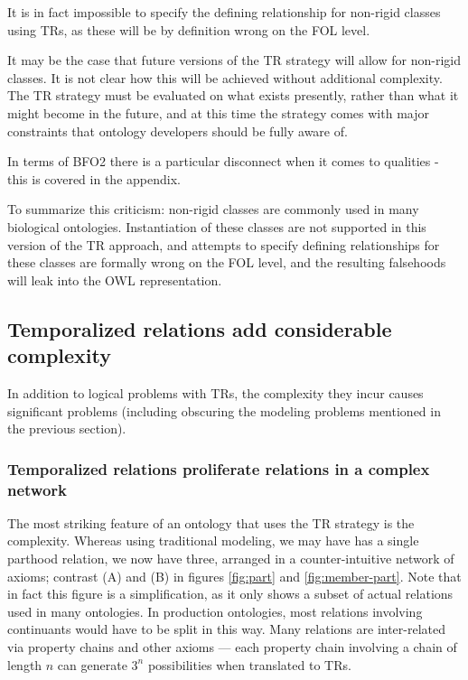 \documentclass{bioinfo}
\begin{document}
It is in fact impossible to specify the defining relationship for
non-rigid classes using TRs, as these will be by definition wrong on
the FOL level.

It may be the case that future versions of the TR strategy will allow
for non-rigid classes. It is not clear how this will be achieved
without additional complexity.  The TR strategy must be evaluated on
what exists presently, rather than what it might become in the future,
and at this time the strategy comes with major constraints that
ontology developers should be fully aware of.

In terms of BFO2 there is a particular disconnect when it comes to
qualities - this is covered in the appendix.

To summarize this criticism: non-rigid classes are commonly used in
many biological ontologies. Instantiation of these classes are not
supported in this version of the TR approach, and attempts to specify
defining relationships for these classes are formally wrong on the FOL
level, and the resulting falsehoods will leak into the OWL
representation.

\subsection{Temporalized relations add considerable complexity}

In addition to logical problems with TRs, the complexity they incur
causes significant problems (including obscuring the modeling
problems mentioned in the previous section).

\subsubsection{Temporalized relations proliferate relations in a complex network}

The most striking feature of an ontology that uses the TR strategy is
the complexity. Whereas using traditional modeling, we may have has a
single parthood relation, we now have three, arranged in a
counter-intuitive network of axioms; contrast (A) and (B) in figures
\ref{fig:part} and \ref{fig:member-part}. Note that in fact this
figure is a simplification, as it only shows a subset of actual
relations used in many ontologies. In production ontologies, most
relations involving continuants would have to be split in this
way. Many relations are inter-related via property chains and other
axioms --- each property chain involving a chain of length $n$ can
generate $3^n$ possibilities when translated to TRs.
\end{document}
